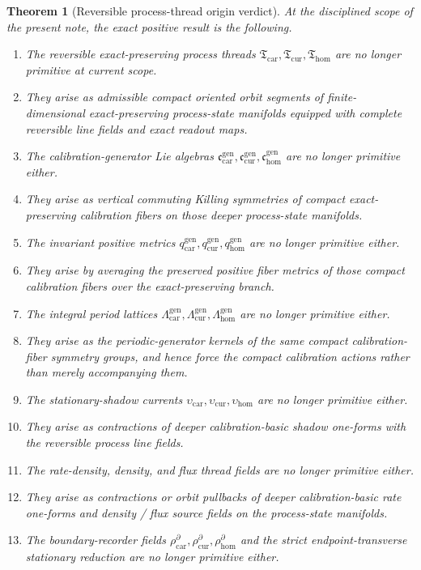 \documentclass[11pt]{article}
\newcommand{\TensorThreadClass}{\mathfrak T_{\mathrm{car}}}
\newcommand{\CurThreadClass}{\mathfrak T_{\mathrm{cur}}}
\newcommand{\HomThreadClass}{\mathfrak T_{\mathrm{hom}}}
\newcommand{\TensorCalLie}{\mathfrak c_{\mathrm{car}}^{\mathrm{gen}}}
\newcommand{\CurCalLie}{\mathfrak c_{\mathrm{cur}}^{\mathrm{gen}}}
\newcommand{\HomCalLie}{\mathfrak c_{\mathrm{hom}}^{\mathrm{gen}}}
\newcommand{\TensorCalMetric}{q_{\mathrm{car}}^{\mathrm{gen}}}
\newcommand{\CurCalMetric}{q_{\mathrm{cur}}^{\mathrm{gen}}}
\newcommand{\HomCalMetric}{q_{\mathrm{hom}}^{\mathrm{gen}}}
\newcommand{\TensorCalLat}{\Lambda_{\mathrm{car}}^{\mathrm{gen}}}
\newcommand{\CurCalLat}{\Lambda_{\mathrm{cur}}^{\mathrm{gen}}}
\newcommand{\HomCalLat}{\Lambda_{\mathrm{hom}}^{\mathrm{gen}}}
\newcommand{\TensorShadowDensity}{\upsilon_{\mathrm{car}}}
\newcommand{\CurShadowDensity}{\upsilon_{\mathrm{cur}}}
\newcommand{\HomShadowDensity}{\upsilon_{\mathrm{hom}}}
\newcommand{\TensorBoundaryRecorder}{\rho_{\mathrm{car}}^{\partial}}
\newcommand{\CurBoundaryRecorder}{\rho_{\mathrm{cur}}^{\partial}}
\newcommand{\HomBoundaryRecorder}{\rho_{\mathrm{hom}}^{\partial}}
\newtheorem{theorem}{Theorem}
\begin{document}
\begin{theorem}[Reversible process-thread origin verdict]
\label{thm:verdict}
At the disciplined scope of the present note, the exact positive result is the following.
\begin{enumerate}
    \item The reversible exact-preserving process threads \(\TensorThreadClass,\CurThreadClass,\HomThreadClass\) are no longer primitive at current scope.
    \item They arise as admissible compact oriented orbit segments of finite-dimensional exact-preserving process-state manifolds equipped with complete reversible line fields and exact readout maps.
    \item The calibration-generator Lie algebras \(\TensorCalLie,\CurCalLie,\HomCalLie\) are no longer primitive either.
    \item They arise as vertical commuting Killing symmetries of compact exact-preserving calibration fibers on those deeper process-state manifolds.
    \item The invariant positive metrics \(\TensorCalMetric,\CurCalMetric,\HomCalMetric\) are no longer primitive either.
    \item They arise by averaging the preserved positive fiber metrics of those compact calibration fibers over the exact-preserving branch.
    \item The integral period lattices \(\TensorCalLat,\CurCalLat,\HomCalLat\) are no longer primitive either.
    \item They arise as the periodic-generator kernels of the same compact calibration-fiber symmetry groups, and hence force the compact calibration actions rather than merely accompanying them.
    \item The stationary-shadow currents \(\TensorShadowDensity,\CurShadowDensity,\HomShadowDensity\) are no longer primitive either.
    \item They arise as contractions of deeper calibration-basic shadow one-forms with the reversible process line fields.
    \item The rate-density, density, and flux thread fields are no longer primitive either.
    \item They arise as contractions or orbit pullbacks of deeper calibration-basic rate one-forms and density / flux source fields on the process-state manifolds.
    \item The boundary-recorder fields \(\TensorBoundaryRecorder,\CurBoundaryRecorder,\HomBoundaryRecorder\) and the strict endpoint-transverse stationary reduction are no longer primitive either.

\end{enumerate}
\end{theorem}
\end{document}
